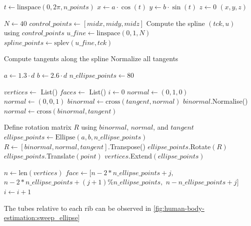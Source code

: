 \begin{algorithm}
    \caption{Sweep Ellipse Along Spline}
    \label{alg:sweep_ellipse}
    \begin{algorithmic}[1]
            \State $t \gets \text{linspace}(0, 2\pi, n\_points)$
            \State $x \gets a \cdot \cos(t)$
            \State $y \gets b \cdot \sin(t)$
            \State $z \gets 0$ 
            \State \Return $(x, y, z)$
        \EndFunction

        \State $N \gets 40$ 
        \State $control\_points \gets [midx, midy, midz]$
        \State Compute the spline $(tck, u)$ using $control\_points$
        \State $u\_fine \gets \text{linspace}(0, 1, N)$
        \State $spline\_points \gets \text{splev}(u\_fine, tck)$

        \State Compute tangents along the spline
        \State Normalize all tangents

        \State $a \gets 1.3 \cdot d$ 
        \State $b \gets 2.6 \cdot d$ 
        \State $n\_ellipse\_points \gets 80$

        \State $vertices \gets$ List()
        \State $faces \gets$ List()
        \State $i \gets 0$
                \State $normal \gets (0, 1, 0)$
            \Else
                \State $normal \gets (0, 0, 1)$
            \EndIf
            \State $binormal \gets \text{cross}(tangent, normal)$
            \State $binormal$.Normalise()
            \State $normal \gets \text{cross}(binormal, tangent)$

            \State Define rotation matrix $R$ using $binormal$, $normal$, and $tangent$
            \State $ellipse\_points \gets \text{Ellipse}(a, b, n\_ellipse\_points)$
            \State $R \gets [binormal, normal, tangent]$.Transpose()
            \State $ellipse\_points$.Rotate$(R)$
            \State $ellipse\_points$.Translate$(point)$
            \State $vertices$.Extend$(ellipse\_points)$

                \State $n \gets \text{len}(vertices)$
                    \State $face \gets [n - 2 * n\_ellipse\_points + j,$ \newline
                    \hspace*{8em} $ n - 2 * n\_ellipse\_points + (j + 1) \%n\_ellipse\_points,$ \newline
                    \hspace*{8em} $n - n\_ellipse\_points + j]$ 
                \EndFor
            \EndIf
            \State $i \gets i + 1$
        \EndFor
    \end{algorithmic}
\end{algorithm}
The tubes relative to each rib can be observed in \autoref{fig:human-body-estimation:sweep_ellipse}

